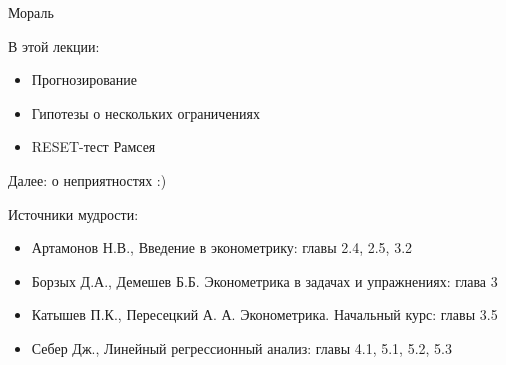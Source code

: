 \documentclass[russian,ignorenonframetext,]{beamer}
\begin{document}
\begin{frame}{Мораль}

В этой лекции:

\begin{itemize}
\item
  Прогнозирование
\item
  Гипотезы о нескольких ограничениях
\item
  RESET-тест Рамсея
\end{itemize}

Далее: о неприятностях :)

\begin{block}{Источники мудрости:}

\begin{itemize}
\item
  Артамонов Н.В., Введение в эконометрику: главы 2.4, 2.5, 3.2
\item
  Борзых Д.А., Демешев Б.Б. Эконометрика в задачах и упражнениях: глава
  3
\item
  Катышев П.К., Пересецкий А. А. Эконометрика. Начальный курс: главы 3.5
\item
  Себер Дж., Линейный регрессионный анализ: главы 4.1, 5.1, 5.2, 5.3
\end{itemize}

\end{block}

\end{frame}
\end{document}
